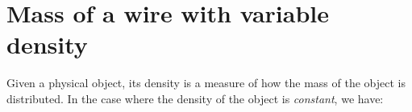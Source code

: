 \documentclass{ximera}
\begin{document}
%
%
%
%
%

\section{Mass of a wire with variable density}

Given a physical object, its density is a measure of how the mass of the object is distributed.  In the case where the density of the object is \emph{constant}, we have:
\end{document}
